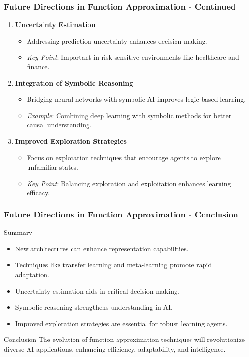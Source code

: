 \documentclass[aspectratio=169]{beamer}
\begin{document}
\begin{frame}[fragile]
  \frametitle{Future Directions in Function Approximation - Continued}
  \begin{enumerate}[resume]
    \item \textbf{Uncertainty Estimation}
      \begin{itemize}
        \item Addressing prediction uncertainty enhances decision-making.
        \item \textit{Key Point}: Important in risk-sensitive environments like healthcare and finance.
      \end{itemize}

    \item \textbf{Integration of Symbolic Reasoning}
      \begin{itemize}
        \item Bridging neural networks with symbolic AI improves logic-based learning.
        \item \textit{Example}: Combining deep learning with symbolic methods for better causal understanding.
      \end{itemize}

    \item \textbf{Improved Exploration Strategies}
      \begin{itemize}
        \item Focus on exploration techniques that encourage agents to explore unfamiliar states.
        \item \textit{Key Point}: Balancing exploration and exploitation enhances learning efficacy.
      \end{itemize}
  \end{enumerate}
\end{frame}

\begin{frame}[fragile]
  \frametitle{Future Directions in Function Approximation - Conclusion}
  \begin{block}{Summary}
    \begin{itemize}
      \item New architectures can enhance representation capabilities.
      \item Techniques like transfer learning and meta-learning promote rapid adaptation.
      \item Uncertainty estimation aids in critical decision-making.
      \item Symbolic reasoning strengthens understanding in AI.
      \item Improved exploration strategies are essential for robust learning agents.
    \end{itemize}
  \end{block}
  \begin{block}{Conclusion}
    The evolution of function approximation techniques will revolutionize diverse AI applications, enhancing efficiency, adaptability, and intelligence.
  \end{block}
\end{frame}
\end{document}
